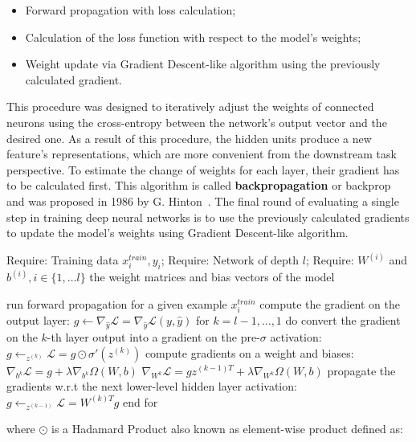 \begin{itemize}
    \item Forward propagation with loss calculation;
    \item Calculation of the loss function with respect to the model's weights;
    \item Weight update via Gradient Descent-like algorithm using the previously calculated gradient.
\end{itemize}

This procedure was designed to iteratively adjust the weights of connected neurons using the cross-entropy between the network's output vector and the desired one. As a result of this procedure, the hidden units produce a new feature's representations, which are more convenient from the downstream task perspective.  To estimate the change of weights for each layer, their gradient has to be calculated first. This algorithm is called \textbf{backpropagation} or backprop and was proposed in 1986 by G. Hinton~\cite{backprop}. 
The final round of evaluating a single step in training deep neural networks is to use the previously calculated gradients to update the model's weights using Gradient Descent-like algorithm. 

\begin{algorithm}[caption={Backward propagation of feed-forward neural network }, label={alg:backward_prop}]
Require: Training data ${x^{train}_{i} , y_{i}}$;
Require: Network of depth $l$;
Require: $W^{(i)}$ and  $b^{(i)}, i \in \{ 1, \ldots l \}$ the weight matrices and bias vectors of the model

run forward propagation for a given example $x^{train}_{i}$
compute the gradient on the output layer: 
$g \leftarrow \nabla_{\hat{y}} \mathcal{L} =  \nabla_{\hat{y}} \mathcal{L}(y, \hat{y})$ 
for $k = l-1, \ldots, 1$ do
   convert the gradient on the $k$-th layer output into a gradient on the pre-$\sigma$ activation: 
   $g \leftarrow_{z^{(k)}} \mathcal{L} = g \odot \sigma'(z^{(k)})$
   compute gradients on a weight and biases:
   $\nabla_{b^{k}} \mathcal{L}  = g + \lambda \nabla_{b^{k}} \Omega(W, b) $ 
   $\nabla_{W^{k}} \mathcal{L}  = g z^{(k-1)T} + \lambda \nabla_{W^{k}} \Omega(W, b) $ 
   propagate the gradients w.r.t the next lower-level hidden layer activation:
   $g \leftarrow_{z^{(k-1)}} \mathcal{L} = W^{(k)T}g$
end for
\end{algorithm}

where $\odot$ is a Hadamard Product also known as element-wise product defined as:

